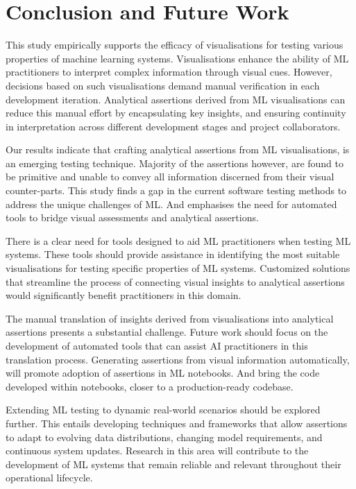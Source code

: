 \section{Conclusion and Future Work}


This study empirically supports the efficacy of visualisations for testing various properties of machine learning systems. Visualisations enhance the ability of ML practitioners to interpret complex information through visual cues. However, decisions based on such visualisations demand manual verification in each development iteration. Analytical assertions derived from ML visualisations can reduce this manual effort by encapsulating key insights, and ensuring continuity in interpretation across different development stages and project collaborators.

Our results indicate that crafting analytical assertions from ML visualisations, is an emerging testing technique. Majority of the assertions however, are found to be primitive and unable to convey all information discerned from their visual counter-parts. This study finds a gap in the current software testing methods to address the unique challenges of ML. And emphasises the need for automated tools to bridge visual assessments and analytical assertions.

There is a clear need for tools designed to aid ML practitioners when testing ML systems. These tools should provide assistance in identifying the most suitable visualisations for testing specific properties of ML systems. Customized solutions that streamline the process of connecting visual insights to analytical assertions would significantly benefit practitioners in this domain.

The manual translation of insights derived from visualisations into analytical assertions presents a substantial challenge. Future work should focus on the development of automated tools that can assist AI practitioners in this translation process. Generating assertions from visual information automatically, will promote adoption of assertions in ML notebooks. And bring the code developed within notebooks, closer to a production-ready codebase.

Extending ML testing to dynamic real-world scenarios should be explored further. This entails developing techniques and frameworks that allow assertions to adapt to evolving data distributions, changing model requirements, and continuous system updates. Research in this area will contribute to the development of ML systems that remain reliable and relevant throughout their operational lifecycle.



